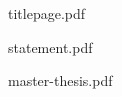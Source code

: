 \documentclass[a4paper]{book}
\begin{document}

    {titlepage.pdf}     

    {statement.pdf}     
    

    {master-thesis.pdf} 
\end{document}
